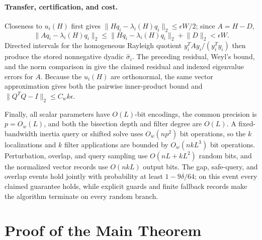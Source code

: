 \documentclass[11pt]{article}
\begin{document}
\paragraph{Transfer, certification, and cost.}
Closeness to $u_i(H)$ first gives
$\lVert Hq_i-\lambda_i(H)q_i\rVert_2\leq\epsilon W/2$; since $A=H-D$,
\[
 \lVert Aq_i-\lambda_i(H)q_i\rVert_2
 \leq\lVert Hq_i-\lambda_i(H)q_i\rVert_2+\lVert D\rVert_2
 <\epsilon W.
\]
Directed intervals for the homogeneous Rayleigh quotient
$y_i^TAy_i/(y_i^Ty_i)$ then produce the stored nonnegative dyadic
$\widehat\sigma_i$.  The preceding residual, Weyl's bound, and
the norm comparison in  give the claimed residual and indexed
eigenvalue errors for $A$.  Because the $u_i(H)$ are orthonormal, the same
vector approximation gives both the pairwise inner-product bound and
$\lVert Q^TQ-I\rVert_2\leq C_wk\epsilon$.

Finally, all scalar parameters have $O(L)$-bit encodings, the common
precision is $p=O_w(L)$, and both the bisection depth and filter degree are
$O(L)$.  A fixed-bandwidth inertia query or shifted solve uses
$O_w(np^2)$ bit operations, so the $k$ localizations and $k$ filter
applications are bounded by $O_w(nkL^3)$ bit operations.  Perturbation,
overlap, and query sampling use $O(nL+kL^2)$ random bits, and the normalized vector
records use $O(nkL)$ output bits.  The gap, safe-query, and overlap events
hold jointly with probability at least $1-9\delta/64$; on this event every
claimed guarantee holds, while explicit guards and finite fallback records
make the algorithm terminate on every random branch.

\section{Proof of the Main Theorem}
\label{sec:proof}
\end{document}
